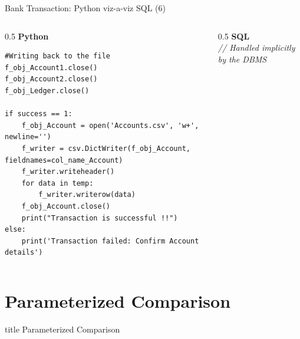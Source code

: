 \documentclass[aspectratio=169, xcolor=dvipsnames]{beamer}
\begin{document}
\begin{frame}[fragile]{Bank Transaction: Python viz-a-viz SQL (6)}
    \begin{columns}[T]
        \begin{column}{0.5\textwidth}
            \textbf{Python}
            \begin{verbatim}
#Writing back to the file 
f_obj_Account1.close()
f_obj_Account2.close()
f_obj_Ledger.close()

if success == 1:
    f_obj_Account = open('Accounts.csv', 'w+', newline='')
    f_writer = csv.DictWriter(f_obj_Account, fieldnames=col_name_Account)
    f_writer.writeheader()
    for data in temp:
        f_writer.writerow(data)
    f_obj_Account.close()
    print("Transaction is successful !!")
else:
    print('Transaction failed: Confirm Account details')
            \end{verbatim}
        \end{column}
        \begin{column}{0.5\textwidth}
            \textbf{SQL} \\
            \vspace{1em}
            \textit{// Handled implicitly by the DBMS}
        \end{column}
    \end{columns}
\end{frame}

\section{Parameterized Comparison}

\begin{frame}
  \vfill
  \centering
  \begin{beamercolorbox}[sep=8pt,center,shadow=true,rounded=true]{title}
    Parameterized Comparison\par%
  \end{beamercolorbox}
  \vfill
\end{frame}
\end{document}
